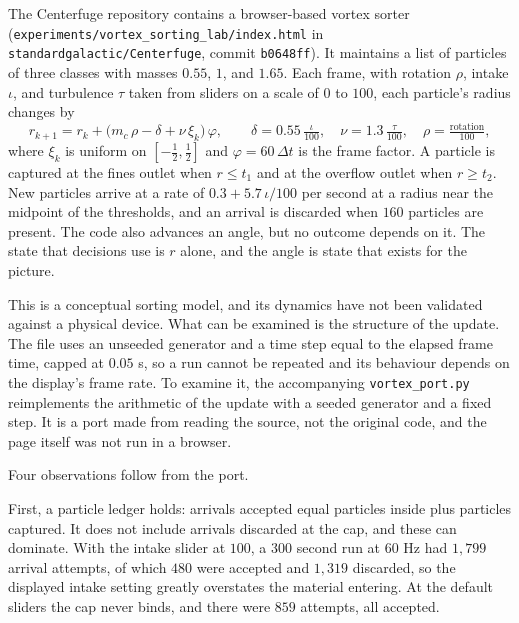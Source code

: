 The Centerfuge repository contains a browser-based vortex sorter (\texttt{experiments/\allowbreak vortex\_\allowbreak sorting\_\allowbreak lab/\allowbreak index.html} in \texttt{standardgalactic/\allowbreak Centerfuge}, commit \texttt{b0648ff}). It maintains a list of particles of three classes with masses $0.55$, $1$, and $1.65$. Each frame, with rotation $\rho$, intake $\iota$, and turbulence $\tau$ taken from sliders on a scale of $0$ to $100$, each particle's radius changes by
\[
  r_{k+1}=r_k+\bigl(m_c\,\rho-\delta+\nu\,\xi_k\bigr)\,\varphi,\qquad
  \delta=0.55\,\tfrac{\iota}{100},\quad \nu=1.3\,\tfrac{\tau}{100},\quad \rho=\tfrac{\text{rotation}}{100},
\]
where $\xi_k$ is uniform on $[-\tfrac12,\tfrac12]$ and $\varphi=60\,\Delta t$ is the frame factor. A particle is captured at the fines outlet when $r\le t_1$ and at the overflow outlet when $r\ge t_2$. New particles arrive at a rate of $0.3+5.7\,\iota/100$ per second at a radius near the midpoint of the thresholds, and an arrival is discarded when $160$ particles are present. The code also advances an angle, but no outcome depends on it. The state that decisions use is $r$ alone, and the angle is state that exists for the picture.

This is a conceptual sorting model, and its dynamics have not been validated against a physical device. What can be examined is the structure of the update. The file uses an unseeded generator and a time step equal to the elapsed frame time, capped at $0.05$ s, so a run cannot be repeated and its behaviour depends on the display's frame rate. To examine it, the accompanying \texttt{vortex\_port.py} reimplements the arithmetic of the update with a seeded generator and a fixed step. It is a port made from reading the source, not the original code, and the page itself was not run in a browser.



Four observations follow from the port.

First, a particle ledger holds: arrivals accepted equal particles inside plus particles captured. It does not include arrivals discarded at the cap, and these can dominate. With the intake slider at $100$, a $300$ second run at $60$ Hz had $1{,}799$ arrival attempts, of which $480$ were accepted and $1{,}319$ discarded, so the displayed intake setting greatly overstates the material entering. At the default sliders the cap never binds, and there were $859$ attempts, all accepted.

